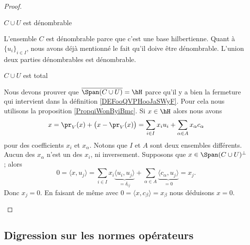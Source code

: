 \begin{proof}
\begin{subproof}
        \item[\( C\cup U\) est dénombrable]

            L'ensemble \( C\) est dénombrable parce que c'est une base hilbertienne. Quant à \( \{ u_i \}_{i\in I}\), nous avons déjà mentionné le fait qu'il doive être dénombrable. L'union deux parties dénombrables est dénombrable.

        \item[\( C\cup U\) est total]

            Nous devons prouver que \( \overline{ \Span(C\cup U) }=\hH\) parce qu'il y a bien la fermeture qui intervient dans la définition \ref{DEFooQVPHooJaSWyF}. Pour cela nous utilisons la proposition \ref{PropqiWonByiBmc}.
            Si \( x\in \hH\) alors nous avons 
           \begin{equation}
               x=\pr_V(x)+\big( x-\pr_V(x) \big)=\sum_{i\in I}x_iu_i+\sum_{\alpha\in A}x_{\alpha}c_{\alpha}
           \end{equation}
           pour des coefficients \( x_i\) et \( x_{\alpha}\). Notons que \( I\) et \( A\) sont deux ensembles différents. Aucun des \( x_{\alpha}\) n'est un des \( x_i\), ni inversement. Supposons que \( x\in \Span(C\cup U)^{\perp}\); alors
           \begin{equation}
               0=\langle x, u_j\rangle =\sum_{i\in I}x_i\underbrace{\langle u_i, u_j\rangle }_{=\delta_{ij}}+\sum_{\alpha\in A}\underbrace{\langle c_{\alpha}, u_j\rangle }_{=0}=x_j.
           \end{equation}
           Donc \( x_j=0\). En faisant de même avec \( 0=\langle x, c_{\beta}\rangle =x_{\beta}\) nous déduisons \( x=0\).

    \end{subproof}
\end{proof}

\subsection{Digression sur les normes opérateurs}
\label{subsecaeSywF}

